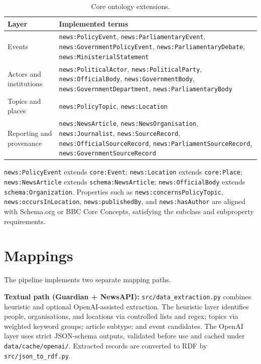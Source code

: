 \documentclass[runningheads]{llncs}
\newcommand{\filepath}[1]{%
  \begingroup\hypersetup{urlcolor=black}\nolinkurl{#1}\endgroup}
\newcommand{\code}[1]{\texttt{#1}}
\newcommand{\ns}[1]{\texttt{news:#1}}
\begin{document}
\begin{table}[t]
\centering
\caption{Core ontology extensions.}\label{tab:ontology}
\setlength{\tabcolsep}{5pt}
\begin{tabular}{@{}p{2.7cm}p{9.3cm}@{}}
\toprule
\textbf{Layer} & \textbf{Implemented terms} \\
\midrule
Events & \ns{PolicyEvent}, \ns{ParliamentaryEvent}, \ns{GovernmentPolicyEvent}, \ns{ParliamentaryDebate}, \ns{MinisterialStatement} \\
Actors and institutions & \ns{PoliticalActor}, \ns{PoliticalParty}, \ns{OfficialBody}, \ns{GovernmentBody}, \ns{GovernmentDepartment}, \ns{ParliamentaryBody} \\
Topics and places & \ns{PolicyTopic}, \ns{Location} \\
Reporting and provenance & \ns{NewsArticle}, \ns{NewsOrganisation}, \ns{Journalist}, \ns{SourceRecord}, \ns{OfficialSourceRecord}, \ns{ParliamentSourceRecord}, \ns{GovernmentSourceRecord} \\
\bottomrule
\end{tabular}
\end{table}

\ns{PolicyEvent} extends \code{core:Event}; \ns{Location} extends \code{core:Place};
\ns{NewsArticle} extends \code{schema:NewsArticle}; \ns{OfficialBody} extends
\code{schema:Organization}. Properties such as \ns{concernsPolicyTopic},
\ns{occursInLocation}, \ns{publishedBy}, and \ns{hasAuthor} are aligned with
Schema.org or BBC Core Concepts, satisfying the subclass and subproperty requirements.

\section{Mappings}\label{sec:mappings}

The pipeline implements two separate mapping paths.

\textbf{Textual path (Guardian + NewsAPI):} \filepath{src/data\_extraction.py}
combines heuristic and optional OpenAI-assisted extraction. The heuristic layer
identifies people, organisations, and locations via controlled lists and regex;
topics via weighted keyword groups; article subtype; and event candidates. The OpenAI
layer uses strict JSON-schema outputs, validated before use and cached under
\filepath{data/cache/openai/}. Extracted records are converted to RDF by \filepath{src/json\_to\_rdf.py}.
\end{document}
